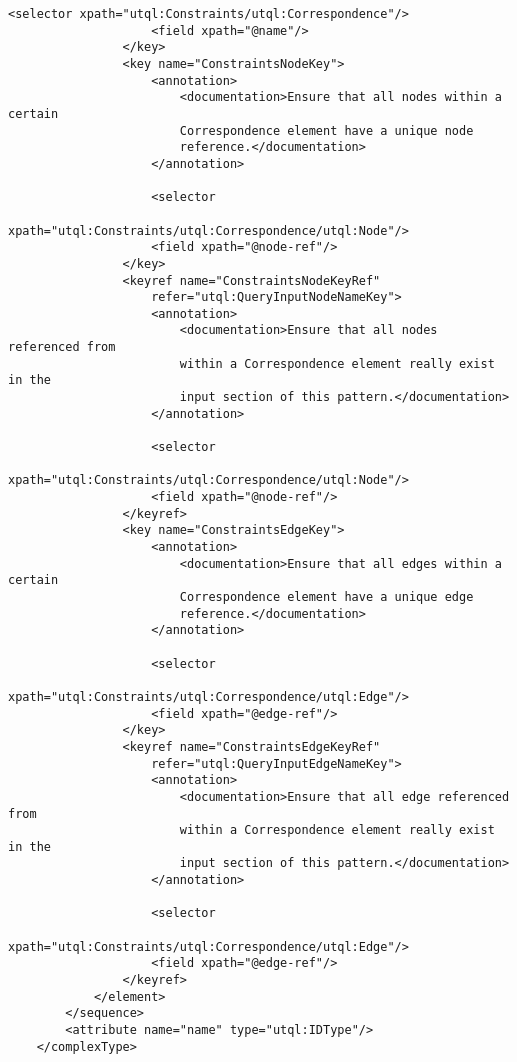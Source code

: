 \documentclass[11pt]{article}
\begin{document}
\begin{Verbatim}[fontsize=\footnotesize,tabsize=2]
                    <selector xpath="utql:Constraints/utql:Correspondence"/>
                    <field xpath="@name"/>
                </key>
                <key name="ConstraintsNodeKey">
                    <annotation>
                        <documentation>Ensure that all nodes within a certain
                        Correspondence element have a unique node
                        reference.</documentation>
                    </annotation>
                    
                    <selector
						xpath="utql:Constraints/utql:Correspondence/utql:Node"/>
                    <field xpath="@node-ref"/>
                </key>
                <keyref name="ConstraintsNodeKeyRef"
                    refer="utql:QueryInputNodeNameKey">
                    <annotation>
                        <documentation>Ensure that all nodes referenced from
                        within a Correspondence element really exist in the
                        input section of this pattern.</documentation>
                    </annotation>
                    
                    <selector
						xpath="utql:Constraints/utql:Correspondence/utql:Node"/>
                    <field xpath="@node-ref"/>
                </keyref>
                <key name="ConstraintsEdgeKey">
                    <annotation>
                        <documentation>Ensure that all edges within a certain
                        Correspondence element have a unique edge
                        reference.</documentation>
                    </annotation>
                    
                    <selector
						xpath="utql:Constraints/utql:Correspondence/utql:Edge"/>
                    <field xpath="@edge-ref"/>
                </key>
                <keyref name="ConstraintsEdgeKeyRef"
                    refer="utql:QueryInputEdgeNameKey">
                    <annotation>
                        <documentation>Ensure that all edge referenced from
                        within a Correspondence element really exist in the
                        input section of this pattern.</documentation>
                    </annotation>
                    
                    <selector
						xpath="utql:Constraints/utql:Correspondence/utql:Edge"/>
                    <field xpath="@edge-ref"/>
                </keyref>
            </element>
        </sequence>
        <attribute name="name" type="utql:IDType"/>
    </complexType>
	

\end{Verbatim}
\end{document}
